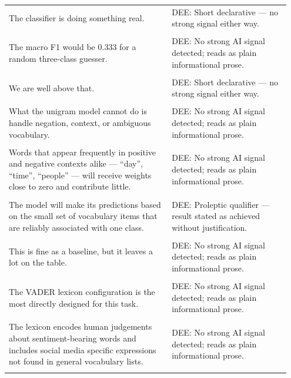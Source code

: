 \documentclass[11pt]{article}
\begin{document}
\begin{longtable}{|p{0.55\linewidth}|p{0.40\linewidth}|}
\hline
\rule{0pt}{3.5cm} & \\
\hline
The classifier is doing something real. & DEE: Short declarative --- no strong signal either way. \\[2pt]
\hline
\rule{0pt}{3.5cm} & \\
\hline
The macro F1 would be 0.333 for a random three-class guesser. & DEE: No strong AI signal detected; reads as plain informational prose. \\[2pt]
\hline
\rule{0pt}{3.5cm} & \\
\hline
We are well above that. & DEE: Short declarative --- no strong signal either way. \\[2pt]
\hline
\rule{0pt}{3.5cm} & \\
\hline
What the unigram model cannot do is handle negation, context, or ambiguous vocabulary. & DEE: No strong AI signal detected; reads as plain informational prose. \\[2pt]
\hline
\rule{0pt}{3.5cm} & \\
\hline
Words that appear frequently in positive and negative contexts alike --- ``day'', ``time'', ``people'' --- will receive weights close to zero and contribute little. & DEE: No strong AI signal detected; reads as plain informational prose. \\[2pt]
\hline
\rule{0pt}{3.5cm} & \\
\hline
The model will make its predictions based on the small set of vocabulary items that are reliably associated with one class. & DEE: Proleptic qualifier --- result stated as achieved without justification. \\[2pt]
\hline
\rule{0pt}{3.5cm} & \\
\hline
This is fine as a baseline, but it leaves a lot on the table. & DEE: No strong AI signal detected; reads as plain informational prose. \\[2pt]
\hline
\rule{0pt}{3.5cm} & \\
\hline
The VADER lexicon configuration is the most directly designed for this task. & DEE: No strong AI signal detected; reads as plain informational prose. \\[2pt]
\hline
\rule{0pt}{3.5cm} & \\
\hline
The lexicon encodes human judgements about sentiment-bearing words and includes social media specific expressions not found in general vocabulary lists. & DEE: No strong AI signal detected; reads as plain informational prose. \\[2pt]
\hline
\rule{0pt}{3.5cm} & \\

\end{longtable}
\end{document}
